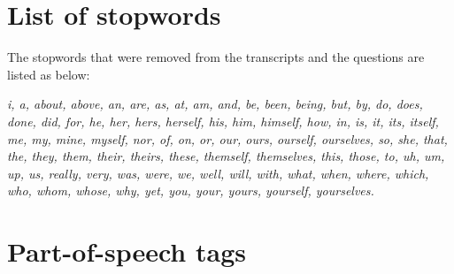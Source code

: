 %
%
%
%
%


\section{List of stopwords}
The stopwords that were removed from the transcripts and the questions are listed as below: 

\small 
\textit{i, a, about, above, an, are, as, at, am, and, be, been, being, but, by, do, does, done, did, for, he, her, hers, herself, his, him, himself, how, in, is, it, its, itself, me, my, mine, myself, nor, of, on, or, our, ours, ourself, ourselves, so, she, that, the, they, them, their, theirs, these, themself, themselves, this, those, to, uh, um, up, us, really, very, was, were, we, well, will, with, what, when, where, which, who, whom, whose, why, yet, you, your, yours, yourself, yourselves.
}
\normalsize

\pagebreak

\section{Part-of-speech tags}

